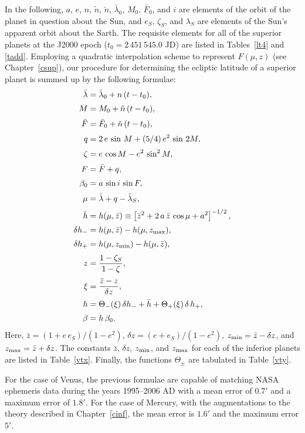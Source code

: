 In the following, $a$, $e$, $n$, $\tilde{n}$, $\breve{n}$, $\bar{\lambda}_0$, $M_0$,  $\bar{F}_0$, and $i$ are  elements of the orbit of the planet in question
about the Sun, and $e_S$, $\zeta_S$, and $\lambda_S$  are elements of the Sun's apparent orbit
about the Sarth. 
The requisite elements for all of the superior planets at the J2000 epoch ($t_0=2\,451\,545.0$ JD)
are listed in Tables~\ref{lt4} and \ref{tadd}.
Employing a quadratic interpolation scheme to represent
$F(\mu,z)$ (see Chapter~\ref{csup}), our procedure for determining the ecliptic latitude of a
superior planet is summed up by the following formulae:
\begin{align}
\bar{\lambda}&=  \bar{\lambda}_0 + n\,(t-t_0) ,\\[0.5ex]
M &= M_0  +\tilde{n}\,(t-t_0),\\[0.5ex]
\bar{F} &= \bar{F}_0 + \breve{n}\,(t-t_0),\\[0.5ex]
q&= 2\,e\,\sin \,M + (5/4)\,e^2\,\sin\,2M,\\[0.5ex]
\zeta &= e\,\cos M - e^2\,\sin^2 M,\\[0.5ex]
F &=\bar{F} + q,\\[0.5ex]
\beta_0  &= a\,\sin i\,\sin F,\\[0.5ex]
\mu&= \bar{\lambda}+q-\bar{\lambda}_S,\\[0.5ex]
\bar{h} &= h(\mu,\bar{z})\equiv\left[\bar{z}^2 + 2\,a\,\bar{z}\,\cos\mu+ a^2\right]^{-1/2},\\[0.5ex]
\delta h_- &=h(\mu,\bar{z}) - h(\mu,z_{\rm max}),\\[0.5ex]
\delta h_+&=h(\mu,z_{\rm min}) - h(\mu,\bar{z}),\\[0.5ex]
z &= \frac{1-\zeta_S}{1-\zeta},\\[0.5ex]
\xi &= \frac{\bar{z}-z}{\delta z},\\[0.5ex]
h  &=\Theta_-(\xi)\,\delta h_-+ \bar{h}
+ \Theta_+(\xi)\,\delta\,h_+,\\[0.5ex]
\beta &=h\,\beta_0.
\end{align}
Here, $\bar{z} = (1+e\,e_S)/(1-e^{2})$, $\delta z = (e+e_S)/(1-e^{2})$, $z_{\rm min} = \bar{z}-\delta z$,
and $z_{\rm max} = \bar{z}+\delta z$. The constants $\bar{z}$, $\delta z$, $z_{\rm min}$, and $z_{\rm max}$ 
for each of the inferior planets are listed in Table~\ref{vtx}.  Finally, the functions $\Theta_\pm$ are  tabulated in Table~\ref{vty}.

For the case of Venus, the previous formulae are capable of matching NASA ephemeris data during the years 1995--2006 AD
with a mean error of $0.7'$ and a maximum error of $1.8'$. For the case of Mercury, with the augmentations to the theory described in Chapter~\ref{cinf}, the mean error is
$1.6'$ and the maximum error $5'$. 

